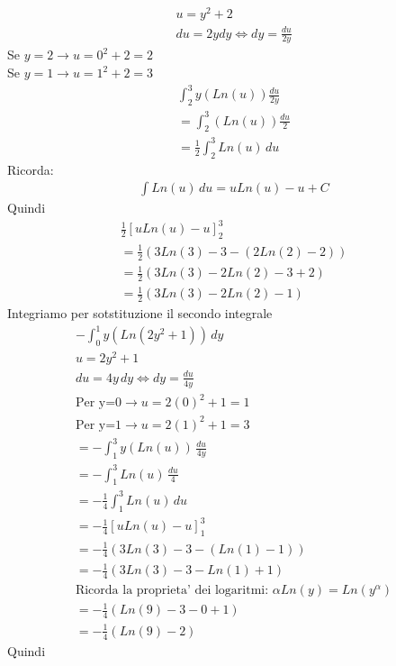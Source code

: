 \documentclass{article}
\begin{document}
\begin{align*}
    u=y^2+2 \\
    du=2ydy \iff dy=\frac{du}{2y}
\end{align*}
Se $y=2 \to u=0^2+2=2$ \\
Se $y=1 \to u=1^2+2=3$
\begin{align*}
    \int_2^3 y(Ln(u))\frac{du}{2y} \\
    = \int_2^3 (Ln(u))\frac{du}{2} \\
    = \frac{1}{2}\int_2^3 Ln(u) \,du
\end{align*}
Ricorda:
\begin{align*}
    \int Ln(u) \,du = uLn(u)-u +C
\end{align*}
Quindi
\begin{align*}
    \frac{1}{2}[uLn(u)-u]_2^3 \\
    = \frac{1}{2}(3Ln(3)-3 - (2Ln(2)-2)) \\
    = \frac{1}{2}(3Ln(3)-2Ln(2)-3+2) \\
    = \frac{1}{2}(3Ln(3)-2Ln(2)-1) 
\end{align*}
Integriamo per sotstituzione il secondo integrale
\begin{align*}
    - \int_0^1 y(Ln(2y^2+1)) \,dy \\
    u=2y^2+1 \\
    du=4y \,dy \iff dy=\frac{du}{4y} \\
    \text{Per y=0} \to u=2(0)^2+1=1 \\
    \text{Per y=1} \to u=2(1)^2+1=3 \\
    = - \int_1^3 y(Ln(u)) \,\frac{du}{4y} \\
    = - \int_1^3 Ln(u) \,\frac{du}{4} \\
    = -\frac{1}{4} \int_1^3 Ln(u) \,du \\
    = - \frac{1}{4}[uLn(u)-u]_1^3 \\
    = -\frac{1}{4}(3Ln(3)-3 - (Ln(1)-1)) \\
    = -\frac{1}{4}(3Ln(3)-3 - Ln(1)+1) \\
    \text{Ricorda la proprieta' dei logaritmi: } \alpha Ln(y)=Ln(y^\alpha) \\
    = -\frac{1}{4}(Ln(9)-3 - 0 +1) \\
    = -\frac{1}{4}(Ln(9)-2)
\end{align*}
Quindi
\end{document}
